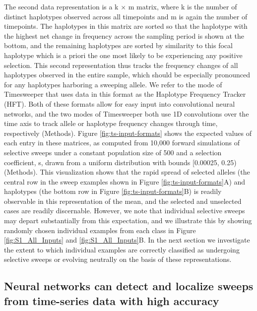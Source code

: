 The second data representation is a k × m matrix, where k is the number of distinct haplotypes observed across all timepoints and m is again the number of timepoints. The haplotypes in this matrix are sorted so that the haplotype with the highest net change in frequency across the sampling period is shown at the bottom, and the remaining haplotypes are sorted by similarity to this focal haplotype which is a priori the one most likely to be experiencing any positive selection. This second representation thus tracks the frequency changes of all haplotypes observed in the entire sample, which should be especially pronounced for any haplotypes harboring a sweeping allele. We refer to the mode of Timesweeper that uses data in this format as the Haplotype Frequency Tracker (HFT). Both of these formats allow for easy input into convolutional neural networks, and the two modes of Timesweeper both use 1D convolutions over the time axis to track allele or haplotype frequency changes through time, respectively (Methods).
Figure \ref{fig:ts-input-formats} shows the expected values of each entry in these matrices, as computed from 10,000 forward simulations of selective sweeps under a constant population size of 500 and a selection coefficient, s, drawn from a uniform distribution with bounds [0.00025, 0.25) (Methods). This visualization shows that the rapid spread of selected alleles (the central row in the sweep examples shown in Figure \ref{fig:ts-input-formats}A) and haplotypes (the bottom row in Figure \ref{fig:ts-input-formats}B) is readily observable in this representation of the mean, and the selected and unselected cases are readily discernable. However, we note that individual selective sweeps may depart substantially from this expectation, and we illustrate this by showing randomly chosen individual examples from each class in Figure \ref{fig:S1_All_Inputs} and \ref{fig:S1_All_Inputs}B. In the next section we investigate the extent to which individual examples are correctly classified as undergoing selective sweeps or evolving neutrally on the basis of these representations. \\

\subsection{Neural networks can detect and localize sweeps from time-series data with high accuracy}

